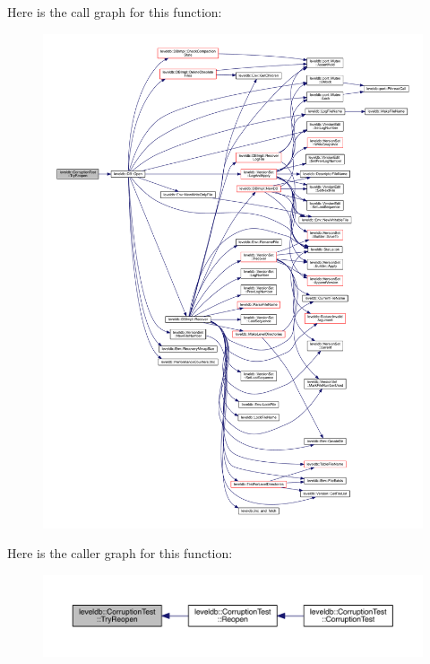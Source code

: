 Here is the call graph for this function\+:\nopagebreak
\begin{figure}[H]
\begin{center}
\leavevmode
\includegraphics[width=350pt]{classleveldb_1_1_corruption_test_af9680fa87bfaf020fc47966c1d2467e8_cgraph}
\end{center}
\end{figure}




Here is the caller graph for this function\+:\nopagebreak
\begin{figure}[H]
\begin{center}
\leavevmode
\includegraphics[width=350pt]{classleveldb_1_1_corruption_test_af9680fa87bfaf020fc47966c1d2467e8_icgraph}
\end{center}
\end{figure}



